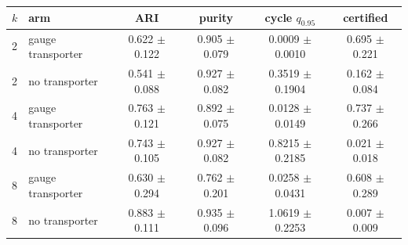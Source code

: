 \begin{tabular}{@{}llcccc@{}}
\toprule
$k$ & arm & ARI & purity & cycle $q_{0.95}$ & certified \\
\midrule
2 & gauge transporter & 0.622 $\pm$ 0.122 & 0.905 $\pm$ 0.079 & 0.0009 $\pm$ 0.0010 & 0.695 $\pm$ 0.221 \\
2 & no transporter & 0.541 $\pm$ 0.088 & 0.927 $\pm$ 0.082 & 0.3519 $\pm$ 0.1904 & 0.162 $\pm$ 0.084 \\
4 & gauge transporter & 0.763 $\pm$ 0.121 & 0.892 $\pm$ 0.075 & 0.0128 $\pm$ 0.0149 & 0.737 $\pm$ 0.266 \\
4 & no transporter & 0.743 $\pm$ 0.105 & 0.927 $\pm$ 0.082 & 0.8215 $\pm$ 0.2185 & 0.021 $\pm$ 0.018 \\
8 & gauge transporter & 0.630 $\pm$ 0.294 & 0.762 $\pm$ 0.201 & 0.0258 $\pm$ 0.0431 & 0.608 $\pm$ 0.289 \\
8 & no transporter & 0.883 $\pm$ 0.111 & 0.935 $\pm$ 0.096 & 1.0619 $\pm$ 0.2253 & 0.007 $\pm$ 0.009 \\
\bottomrule
\end{tabular}
